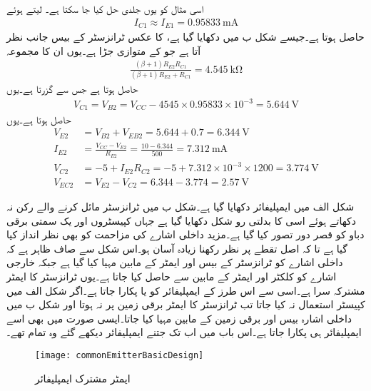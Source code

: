 اسی مثال کو یوں جلدی حل کیا جا سکتا ہے۔ لیتے ہوئے
\begin{align*}
I_{C1} \approx I_{E1}=\SI{0.95833}{\milli \ampere}
\end{align*}
حاصل ہوتا ہے۔جیسے شکل  ب میں دکھایا گیا ہے،  کا عکس ٹرانزسٹر  کے بیس جانب  نظر آتا ہے جو  کے متوازی جڑا ہے۔یوں ان کا مجموعہ
\begin{align*}
\frac{\left(\beta+1 \right) R_{E2} R_{C1}}{\left(\beta+1 \right) R_{E2}+R_{C1}}=\SI{4.545}{\kilo \ohm}
\end{align*}
حاصل ہوتا ہے جس سے  گزرتا ہے۔یوں
\begin{align*}
V_{C1}=V_{B2}=V_{CC}-4545 \times 0.95833 \times 10^{-3}=\SI{5.644}{\volt}
\end{align*}
حاصل ہوتا ہے۔یوں
\begin{align*}
V_{E2}&=V_{B2}+V_{EB2}=5.644+0.7=\SI{6.344}{\volt}\\
I_{E2}&=\frac{V_{CC}-V_{E2}}{R_{E2}}=\frac{10-6.344}{500}=\SI{7.312}{\milli \ampere}\\
V_{C2}&=-5+I_{E2} R_{C2}=-5+7.312 \times 10^{-3} \times 1200=\SI{3.774}{\volt}\\
V_{EC2}&=V_{E2}-V_{C2}=6.344-3.774=\SI{2.57}{\volt}
\end{align*}



شکل  الف   میں ایمپلیفائر دکھایا گیا ہے۔شکل  ب میں ٹرانزسٹر مائل کرنے والے رکن نہ دکھاتے ہوئے اسی کا بدلتی رو شکل دکھایا گیا ہے جہاں کپیسٹروں اور یک سمتی برقی دباو  کو قصر دور تصور کیا گیا ہے۔مزید داخلی اشارے کی مزاحمت  کو بھی نظر انداز کیا گیا ہے تا کہ اصل تقطے پر نظر رکھنا زیادہ آسان ہو۔اس شکل سے صاف ظاہر ہے کہ داخلی اشارے کو ٹرانزسٹر کے بیس  اور ایمٹر  کے مابین مہیا کیا گیا ہے جبکہ خارجی اشارے کو کلکٹر   اور ایمٹر  کے مابین سے حاصل کیا جاتا ہے۔یوں ٹرانزسٹر کا ایمٹر  مشترکہ سرا ہے۔اسی سے اس طرز کے ایمپلیفائر کو  یا  پکارا جاتا ہے۔اگر شکل  الف   میں کپیسٹر  استعمال نہ کیا جاتا تب ٹرانزسٹر کا ایمٹر برقی زمین پر نہ ہوتا اور شکل  ب میں داخلی اشارہ بیس اور برقی زمین کے مابین مہیا کیا جاتا۔ایسی صورت میں بھی اسے  ایمپلیفائر ہی پکارا جاتا ہے۔اس باب میں اب تک جتنے ایمپلیفائر دیکھے گئے وہ تمام  تھے۔
\begin{figure}
\centering
\texttt{[image: commonEmitterBasicDesign]}
\caption{ایمٹر مشترک ایمپلیفائر}
\label{شکل_دو_جوڑ_ٹرانزسٹر_مشترکہ_مخارج_ایمپلیفائر}
\end{figure}

